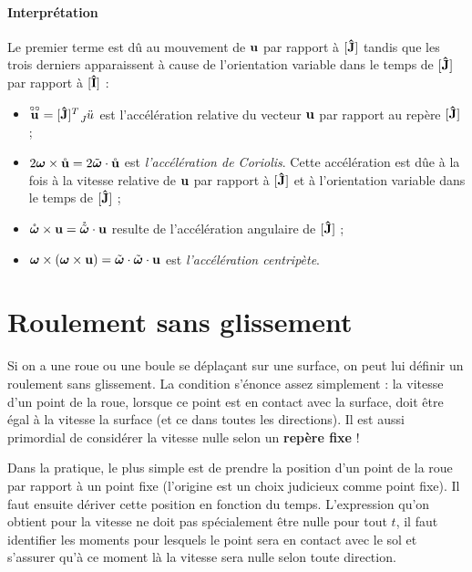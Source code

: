 \paragraph{Interprétation}

Le premier terme est dû au mouvement de ${\bf u}$ par rapport à $[{\bf\hat{J}}]$ tandis que les trois derniers apparaissent à cause de l'orientation variable dans le temps de $[{\bf\hat{J}}]$ par rapport à $[{\bf\hat{I}}]$ :

\begin{itemize}
	\item $\fvrr{u} = [\uj]^T \wrt{J}{\ddot{u}}$ est l'accélération relative du vecteur ${\bf u}$ par rapport au repère $[{\bf\hat{J}}]$ ;
	\item $2 {\bm \omega} \times \mathring{\bf u} = 2 \tilde{\bm \omega} \cdot \mathring{\bf u}$ est \textit{l'accélération de Coriolis}. Cette accélération est dûe à la fois à la vitesse relative de ${\bf u}$ par rapport à $[{\bf\hat{J}}]$ et à l'orientation variable dans le temps de $[{\bf\hat{J}}]$ ;
	\item $\mathring{\bm \omega} \times {\bf u} = \mathring{\tilde{\bm \omega}} \cdot {\bf u}$ resulte de l'accélération angulaire de $[{\bf\hat{J}}]$ ;
	\item ${\bm \omega} \times ({\bm \omega} \times {\bf u}) = \tilde{\bm \omega} \cdot \tilde{\bm \omega} \cdot {\bf u}$ est 
	\textit{l'accélération centripète}.
\end{itemize}

\section{Roulement sans glissement}

Si on a une roue ou une boule se déplaçant sur une surface, on peut lui définir un roulement sans glissement.
La condition s'énonce assez simplement :
la vitesse d'un point de la roue, lorsque ce point est en contact avec la surface, doit
être égal à la vitesse la surface (et ce dans toutes les directions).
Il est aussi primordial de considérer la vitesse nulle selon un {\bf repère fixe} !

Dans la pratique, le plus simple est de prendre la position d'un point de la roue par rapport à un point fixe (l'origine est un choix judicieux comme point fixe).
Il faut ensuite dériver cette position en fonction du temps.
L'expression qu'on obtient pour la vitesse ne doit pas spécialement être nulle pour tout $t$, il faut identifier les moments pour lesquels le point sera en contact avec le sol et s'assurer qu'à ce moment là la vitesse sera nulle selon toute direction.

